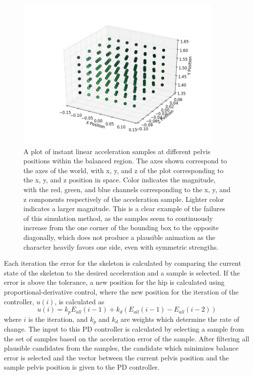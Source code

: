 \begin{figure}[ht]
	\centering
	\includegraphics[width=4in]{images/K200000_global_dense_torque.png}
	\caption[A plot of a sample field for the torque based simulation]{A plot of instant linear acceleration samples at different pelvis positions within the balanced region.  The axes shown correspond to the axes of the world, with x, y, and z of the plot corresponding to the x, y, and z position in space.  Color indicates the magnitude, with the red, green, and blue channels corresponding to the x, y, and z components respectively of the acceleration sample.  Lighter color indicates a larger magnitude.  This is a clear example of the failures of this simulation method, as the samples seem to continuously increase from the one corner of the bounding box to the opposite diagonally, which does not produce a plausible animation as the character heavily favors one side, even with symmetric strengths.}
	\label{fig:torque_samples}
\end{figure}

Each iteration the error for the skeleton is calculated by comparing the current state of the skeleton to the desired acceleration and a sample is selected.  If the error is above the tolerance, a new position for the hip is calculated using proportional-derivative control, where the new position for the iteration of the controller, $u(i)$, is calculated as \[u(i) = k_p E_{all}(i - 1) + k_d(E_{all}(i-1) - E_{all}(i-2))\] where $i$ is the iteration, and $k_p$ and $k_d$ are weights which determine the rate of change.  The input to this PD controller is calculated by selecting a sample from the set of samples based on the acceleration error of the sample.  After filtering all plausible candidates from the samples, the candidate which minimizes balance error is selected and the vector between the current pelvis position and the sample pelvis position is given to the PD controller.  

